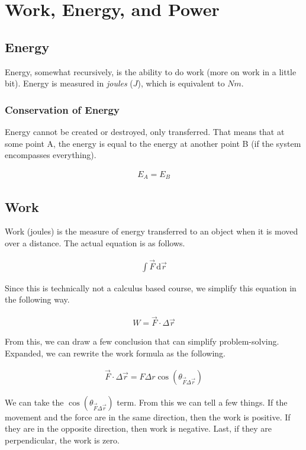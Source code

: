 \section{Work, Energy, and Power}
\subsection{Energy}
Energy, somewhat recursively, is the ability to do work (more on work
in a little bit). Energy is measured in \textit{joules} ($J$), which is equivalent to
$Nm$.

\subsubsection{Conservation of Energy}
Energy cannot be created or destroyed, only transferred. That means
that at some point A, the energy is equal to the energy at another
point B (if the system encompasses everything).

\begin{eqnarray} \nonumber
    E_A = E_B
\end{eqnarray}

\subsection{Work}
Work (joules) is the measure of energy transferred to an object when it is 
moved over a distance. The actual equation is as follows.

\begin{eqnarray} \label{eq : true work}
    \int \vec{F} \, \text{d}\vec{r}
\end{eqnarray}

\noindent Since this is technically not a calculus based course, we simplify
this equation in the following way.

\begin{eqnarray} \label{eq : work}
    W = \vec{F} \cdot \Delta \vec{r}
\end{eqnarray}

\noindent From this, we can draw a few conclusion that can simplify 
problem-solving. Expanded, we can rewrite the work formula as the
following.

\begin{eqnarray} \nonumber
    \vec{F} \cdot \Delta \vec{r} = F \Delta r \cos(\theta_{\vec{F} \Delta \vec{r}})
\end{eqnarray}

We can take the $\cos(\theta_{\vec{F} \Delta \vec{r}})$ term. From this we
can tell a few things. If the movement and the force are in the same
direction, then the work is positive. If they are in the opposite
direction, then work is negative. Last, if they are perpendicular,
the work is zero.

